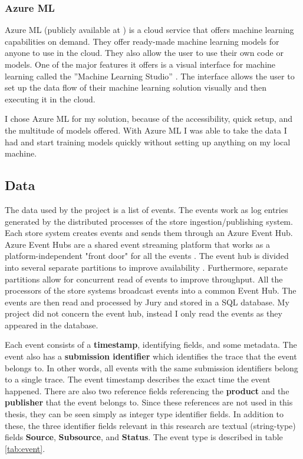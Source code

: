 \subsubsection{Azure ML}

Azure ML (publicly available at \cite{azuremlpub}) is a cloud service that offers machine learning capabilities on demand. 
They offer ready-made machine learning models for anyone to use in the cloud.
They also allow the user to use their own code or models.
One of the major features it offers is a visual interface for machine learning called the ''Machine Learning Studio'' \cite{azureml}.
The interface allows the user to set up the data flow of their machine learning solution visually and then executing it in the cloud.

I chose Azure ML for my solution, because of the accessibility, quick setup, and the multitude of models offered.
With Azure ML I was able to take the data I had and start training models quickly without setting up anything on my local machine.

\subsection{Data}
The data used by the project is a list of events. The events work as log entries generated by the distributed processes of the store ingestion/publishing system. Each store system creates events and sends them through an Azure Event Hub. 
Azure Event Hubs are a shared event streaming platform that works as a platform-independent "front door" for all the events \cite{eventhubs}. 
The event hub is divided into several separate partitions to improve availability \cite{eventhubavail}.
Furthermore, separate partitions allow for concurrent read of events to improve throughput.
All the processors of the store systems broadcast events into a common Event Hub.
The events are then read and processed by Jury and stored in a SQL database.
My project did not concern the event hub, instead I only read the events as they appeared in the database.

Each event consists of a \textbf{timestamp}, identifying fields, and some metadata. 
The event also has a \textbf{submission identifier} which identifies the trace that the event belongs to.
In other words, all events with the same submission identifiers belong to a single trace.
The event timestamp describes the exact time the event happened. There are also two reference fields referencing the \textbf{product} and the \textbf{publisher} that the event belongs to. 
Since these references are not used in this thesis, they can be seen simply as integer type identifier fields.
In addition to these, the three identifier fields relevant in this research are textual (string-type) fields \textbf{Source}, \textbf{Subsource}, and \textbf{Status}.
The event type is described in table \ref{tab:event}.

